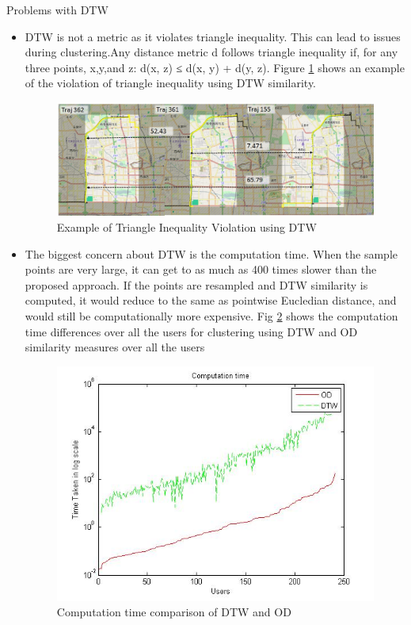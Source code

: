 Problems with DTW
\begin{itemize}
\item
DTW is not a metric as it violates triangle inequality. This can lead to issues during clustering.Any distance metric d follows triangle inequality if, for any three points, x,y,and z: d(x, z) ≤ d(x, y) + d(y, z).     Figure \ref{fig:dtw_triangleineq} shows an example of the violation of triangle inequality using DTW similarity.
\begin{figure}
\centering     
\includegraphics[scale=0.3]{figs/DTW_triangle_ineq.jpg}
\caption{Example of Triangle Inequality Violation using DTW }
\label{fig:dtw_triangleineq}  
\end{figure}

\item 
The biggest concern about DTW is the computation time. When the sample points are very large, it can get to as much as 400 times slower than the proposed approach. If the points are resampled and DTW similarity is computed, it would reduce to the same as pointwise Eucledian distance, and would still be computationally more expensive. Fig \ref{fig:time_dtw_od} shows the computation time differences over all the users for clustering using  DTW and OD similarity measures over all the users

\begin{figure}
\centering     
\includegraphics[scale=0.3]{figs/time_dtw_od.jpg}
\caption{Computation time comparison of DTW and OD }
\label{fig:time_dtw_od}  
\end{figure}


\end{itemize}
